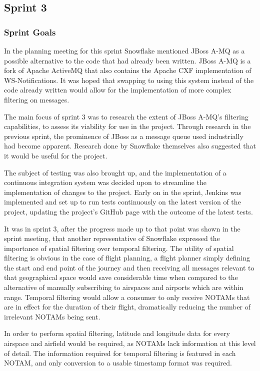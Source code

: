 \documentclass[a4paper, 12pt, twoside]{article}
\begin{document}
\subsection{Sprint 3}
\label{sec:impl_sprint_3}

\subsubsection{Sprint Goals}

In the planning meeting for this sprint Snowflake mentioned JBoss A-MQ as a possible alternative to the code that had already been written. JBoss A-MQ is a fork of Apache ActiveMQ that also contains the Apache CXF implementation of WS-Notifications. It was hoped that swapping to using this system instead of the code already written would allow for the implementation of more complex filtering on messages. 

The main focus of sprint 3 was to research the extent of JBoss A-MQ's filtering capabilities, to assess its viability for use in the project. Through research in the previous sprint, the prominence of JBoss as a message queue used industrially had become apparent. Research done by Snowflake themselves also suggested that it would be useful for the project.

The subject of testing was also brought up, and the implementation of a continuous integration system was decided upon to streamline the implementation of changes to the project. Early on in the sprint, Jenkins was implemented and set up to run tests continuously on the latest version of the project, updating the project's GitHub page with the outcome of the latest tests.

It was in sprint 3, after the progress made up to that point was shown in the sprint meeting, that another representative of Snowflake expressed the importance of spatial filtering over temporal filtering. The utility of spatial filtering is obvious in the case of flight planning, a flight planner simply defining the start and end point of the journey and then receiving all messages relevant to that geographical space would save considerable time when compared to the alternative of manually subscribing to airspaces and airports which are within range. Temporal filtering would allow a consumer to only receive NOTAMs that are in effect for the duration of their flight, dramatically reducing the number of irrelevant NOTAMs being sent.

In order to perform spatial filtering, latitude and longitude data for every airspace and airfield would be required, as NOTAMs lack information at this level of detail. The information required for temporal filtering is featured in each NOTAM, and only conversion to a usable timestamp format was required.
\end{document}
